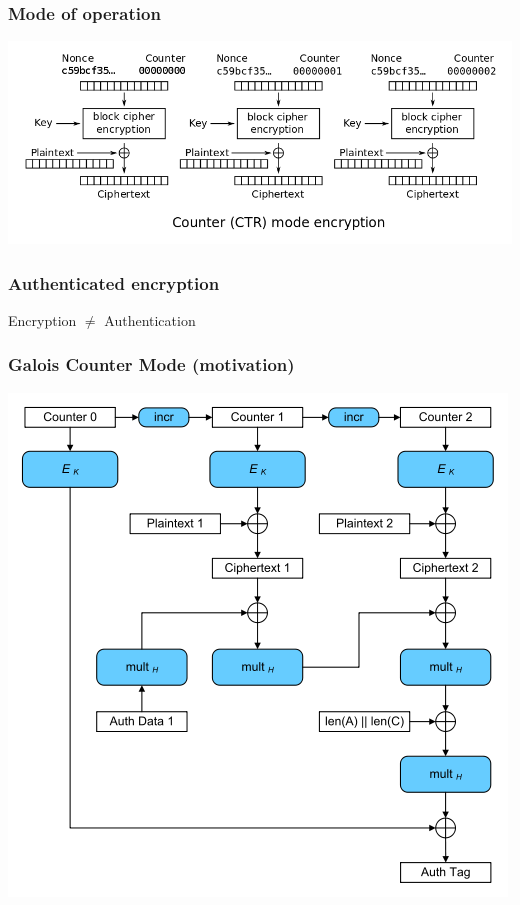\documentclass{beamer}
\begin{document}
\begin{frame}
\frametitle{Mode of operation}
\begin{center}
\includegraphics[width=\textwidth]{mode-ctr.png}
\end{center}
\end{frame}

\begin{frame}
\frametitle{Authenticated encryption}
\begin{center}
Encryption $\neq$ Authentication
\end{center}
\end{frame}

\begin{frame}
\frametitle{Galois Counter Mode (motivation)}
\begin{center}
\includegraphics[height=0.8\textheight]{mode-gcm.png}
\end{center}
\end{frame}
\end{document}
